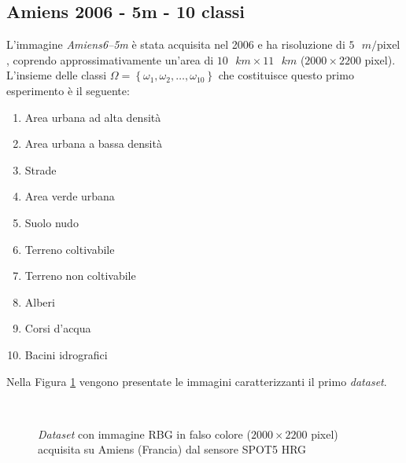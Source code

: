 \subsection{Amiens 2006 - 5m - 10 classi}
L'immagine \emph{Amiens6--5m} è stata acquisita nel 2006 e ha risoluzione di $5\text{ }m/\text{pixel}$, coprendo approssimativamente un'area di $10\text{ }km\times11\text{ }km$ ($2000\times2200$ pixel).\\
L'insieme delle classi $\Omega=\left\lbrace\omega_1,\omega_2,\ldots,\omega_{10}\right\rbrace$ che costituisce questo primo esperimento è il seguente:
\begin{enumerate}
\item Area urbana ad alta densità
\item Area urbana a bassa densità
\item Strade
\item Area verde urbana 
\item Suolo nudo
\item Terreno coltivabile
\item Terreno non coltivabile 
\item Alberi
\item Corsi d'acqua
\item Bacini idrografici
\end{enumerate}
Nella Figura \ref{fig: Amiens65m} vengono presentate le immagini caratterizzanti il primo \emph{dataset}. 

\clearpage
\begin{figure}[!ht]
   \center
   \\%
     \hspace{4mm}
    \caption{\emph{Dataset} con immagine RBG in falso colore ($2000\times2200$ pixel) acquisita su Amiens (Francia) dal sensore \textsc{SPOT5 HRG}}
    \label{fig: Amiens65m}
  \end{figure}
  
\clearpage
